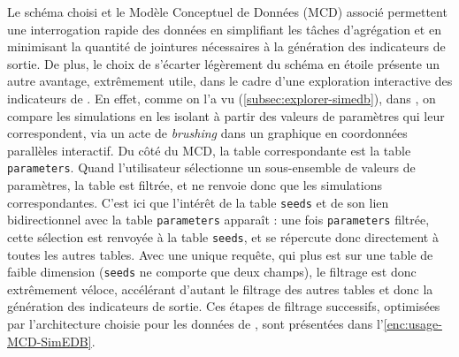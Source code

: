 Le schéma choisi et le Modèle Conceptuel de Données (MCD) associé permettent une interrogation rapide des données en simplifiant les tâches d'agrégation et en minimisant la quantité de jointures nécessaires à la génération des indicateurs de sortie.
De plus, le choix de s'écarter légèrement du schéma en étoile présente un autre avantage, extrêmement utile, dans le cadre d'une exploration interactive des indicateurs de \simfeodal{}.
En effet, comme on l'a vu (\cref{subsec:explorer-simedb}), dans \simedb{}, on compare les simulations en les isolant à partir des valeurs de paramètres qui leur correspondent, via un acte de \textit{brushing} dans un graphique en coordonnées parallèles interactif.
Du côté du MCD, la table correspondante est la table \texttt{parameters}.
Quand l'utilisateur sélectionne un sous-ensemble de valeurs de paramètres, la table est filtrée, et ne renvoie donc que les simulations correspondantes.
C'est ici que l'intérêt de la table \texttt{seeds} et de son lien bidirectionnel avec la table \texttt{parameters} apparaît : une fois \texttt{parameters} filtrée, cette sélection est renvoyée à la table \texttt{seeds}, et se répercute donc directement à toutes les autres tables.
Avec une unique requête, qui plus est sur une table de faible dimension (\texttt{seeds} ne comporte que deux champs), le filtrage est donc extrêmement véloce, accélérant d'autant le filtrage des autres tables et donc la génération des indicateurs de sortie.
Ces étapes de filtrage successifs, optimisées par l'architecture choisie pour les données de \simfeodal{}, sont présentées dans l'\cref{enc:usage-MCD-SimEDB}.

\clearpage

